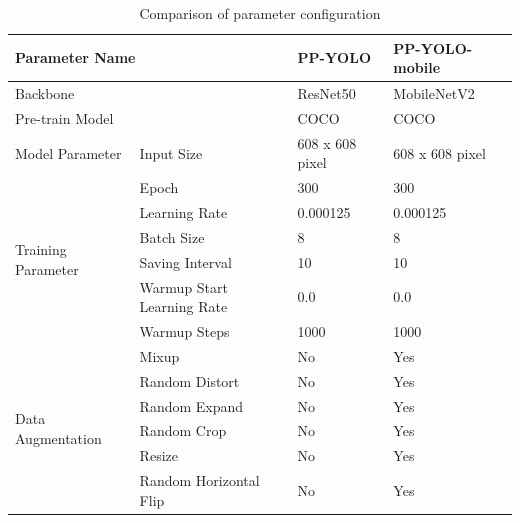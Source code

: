 \documentclass[sensors,article,submit,moreauthors,pdftex]{Definitions/mdpi}
\begin{document}
\begin{table}[H]
\centering
\caption{Comparison of parameter configuration}
\begin{tabular}{llll} 
\toprule
\multicolumn{2}{l}{\textbf{Parameter Name}}&\textbf{PP-YOLO}&\textbf{PP-YOLO-mobile}\\
\midrule
\multicolumn{2}{l}{Backbone} & ResNet50 & MobileNetV2 \\
\multicolumn{2}{l}{Pre-train Model} & COCO & COCO \\
\cmidrule(r){1-4}

\multirow{1}{*}{Model Parameter} 
& Input Size & 608 x 608 pixel  & 608 x 608 pixel  \\
\cmidrule(r){1-4}

\multirow{6}{*}{Training Parameter} 
& Epoch& 300  & 300  \\
& Learning Rate & 0.000125 & 0.000125  \\
& Batch Size & 8 & 8 \\
& Saving Interval & 10 & 10 \\
& Warmup Start Learning Rate & 0.0 & 0.0 \\
& Warmup Steps & 1000 & 1000 \\
\cmidrule(r){1-4}

\multirow{6}{*}{Data Augmentation} 
& Mixup& No  & Yes  \\
& Random Distort & No & Yes  \\
& Random Expand & No & Yes \\
& Random Crop  & No & Yes \\
& Resize & No & Yes \\
& Random Horizontal Flip & No & Yes \\

\bottomrule
\end{tabular}
\label{tbl:Parameter}
\end{table}
\end{document}

